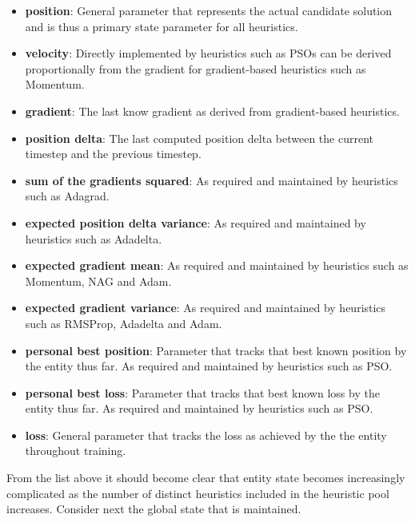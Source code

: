 \begin{itemize}
      \item \textbf{position}: General parameter that represents the actual candidate solution and is thus a primary state parameter for all heuristics.

      \item \textbf{velocity}: Directly implemented by heuristics such as \acp{PSO} can be derived proportionally from the gradient for gradient-based heuristics such as \ac{Momentum}.

      \item \textbf{gradient}: The last know gradient as derived from gradient-based heuristics.

      \item \textbf{position delta}: The last computed position delta between the current timestep and the previous timestep.

      \item \textbf{sum of the gradients squared}: As required and maintained by heuristics such as \ac{Adagrad}.

      \item \textbf{expected position delta variance}: As required and maintained by heuristics such as \ac{Adadelta}.

      \item \textbf{expected gradient mean}: As required and maintained by heuristics such as \ac{Momentum}, \ac{NAG} and \ac{Adam}.

      \item \textbf{expected gradient variance}: As required and maintained by heuristics such as \ac{RMSProp}, \ac{Adadelta} and \ac{Adam}.

      \item \textbf{personal best position}: Parameter that tracks that best known position by the entity thus far. As required and maintained by heuristics such as \ac{PSO}.

      \item \textbf{personal best loss}: Parameter that tracks that best known loss by the entity thus far. As required and maintained by heuristics such as \ac{PSO}.

      \item \textbf{loss}: General parameter that tracks the loss as achieved by the the entity throughout training.
\end{itemize}

From the list above it should become clear that entity state becomes increasingly complicated as the number of distinct heuristics included in the heuristic pool increases. Consider next the global state that is maintained.

